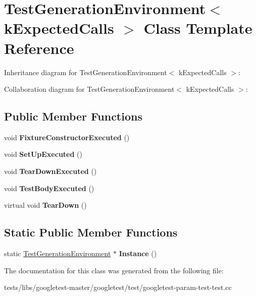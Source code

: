 \hypertarget{classTestGenerationEnvironment}{}\section{Test\+Generation\+Environment$<$ k\+Expected\+Calls $>$ Class Template Reference}
\label{classTestGenerationEnvironment}


Inheritance diagram for Test\+Generation\+Environment$<$ k\+Expected\+Calls $>$\+:


Collaboration diagram for Test\+Generation\+Environment$<$ k\+Expected\+Calls $>$\+:
\subsection*{Public Member Functions}
\begin{DoxyCompactItemize}
\item 
\mbox{\label{classTestGenerationEnvironment_abcdae77887fbd6dba18f4a55b80f058d}} 
void {\bfseries Fixture\+Constructor\+Executed} ()
\item 
\mbox{\label{classTestGenerationEnvironment_aa17c620af5eb9929bdbde25820cd8e28}} 
void {\bfseries Set\+Up\+Executed} ()
\item 
\mbox{\label{classTestGenerationEnvironment_a0d2576b10818bae1945e17e6e749ff9b}} 
void {\bfseries Tear\+Down\+Executed} ()
\item 
\mbox{\label{classTestGenerationEnvironment_a358a1d7cbefc3f9157f625f87dbde754}} 
void {\bfseries Test\+Body\+Executed} ()
\item 
\mbox{\label{classTestGenerationEnvironment_ac3787d8afb43b97b0b3d6dec78b04798}} 
virtual void {\bfseries Tear\+Down} ()
\end{DoxyCompactItemize}
\subsection*{Static Public Member Functions}
\begin{DoxyCompactItemize}
\item 
\mbox{\label{classTestGenerationEnvironment_a5b8e14f430fe11d558c0e4482cebd694}} 
static \hyperlink{classTestGenerationEnvironment}{Test\+Generation\+Environment} $\ast$ {\bfseries Instance} ()
\end{DoxyCompactItemize}


The documentation for this class was generated from the following file\+:\begin{DoxyCompactItemize}
\item 
tests/libs/googletest-\/master/googletest/test/googletest-\/param-\/test-\/test.\+cc\end{DoxyCompactItemize}

